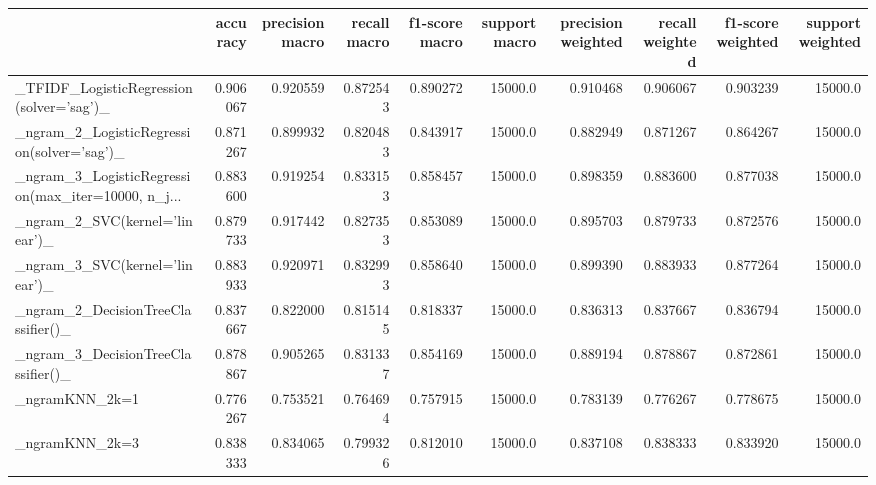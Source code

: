 \begin{tabular}{lrrrrrrrrr}
\toprule
{} &  accuracy &  precision macro &  recall macro &  f1-score macro &  support macro &  precision weighted &  recall weighted &  f1-score weighted &  support weighted \\
\midrule
\_TFIDF\_LogisticRegression(solver='sag')\_           &  0.906067 &         0.920559 &      0.872543 &        0.890272 &        15000.0 &            0.910468 &         0.906067 &           0.903239 &           15000.0 \\
\_ngram\_2\_LogisticRegression(solver='sag')\_         &  0.871267 &         0.899932 &      0.820483 &        0.843917 &        15000.0 &            0.882949 &         0.871267 &           0.864267 &           15000.0 \\
\_ngram\_3\_LogisticRegression(max\_iter=10000, n\_j... &  0.883600 &         0.919254 &      0.833153 &        0.858457 &        15000.0 &            0.898359 &         0.883600 &           0.877038 &           15000.0 \\
\_ngram\_2\_SVC(kernel='linear')\_                     &  0.879733 &         0.917442 &      0.827353 &        0.853089 &        15000.0 &            0.895703 &         0.879733 &           0.872576 &           15000.0 \\
\_ngram\_3\_SVC(kernel='linear')\_                     &  0.883933 &         0.920971 &      0.832993 &        0.858640 &        15000.0 &            0.899390 &         0.883933 &           0.877264 &           15000.0 \\
\_ngram\_2\_DecisionTreeClassifier()\_                 &  0.837667 &         0.822000 &      0.815145 &        0.818337 &        15000.0 &            0.836313 &         0.837667 &           0.836794 &           15000.0 \\
\_ngram\_3\_DecisionTreeClassifier()\_                 &  0.878867 &         0.905265 &      0.831337 &        0.854169 &        15000.0 &            0.889194 &         0.878867 &           0.872861 &           15000.0 \\
\_ngramKNN\_2k=1                                     &  0.776267 &         0.753521 &      0.764694 &        0.757915 &        15000.0 &            0.783139 &         0.776267 &           0.778675 &           15000.0 \\
\_ngramKNN\_2k=3                                     &  0.838333 &         0.834065 &      0.799326 &        0.812010 &        15000.0 &            0.837108 &         0.838333 &           0.833920 &           15000.0 \\

\end{tabular}
